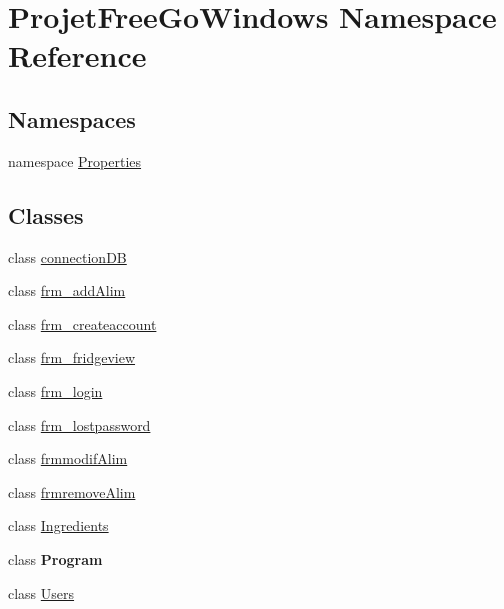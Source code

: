 \hypertarget{namespace_projet_free_go_windows}{}\section{Projet\+Free\+Go\+Windows Namespace Reference}
\label{namespace_projet_free_go_windows}
\subsection*{Namespaces}
\begin{DoxyCompactItemize}
\item 
namespace \hyperlink{namespace_projet_free_go_windows_1_1_properties}{Properties}
\end{DoxyCompactItemize}
\subsection*{Classes}
\begin{DoxyCompactItemize}
\item 
class \hyperlink{class_projet_free_go_windows_1_1connection_d_b}{connection\+DB}
\item 
class \hyperlink{class_projet_free_go_windows_1_1frm__add_alim}{frm\+\_\+add\+Alim}
\item 
class \hyperlink{class_projet_free_go_windows_1_1frm__createaccount}{frm\+\_\+createaccount}
\item 
class \hyperlink{class_projet_free_go_windows_1_1frm__fridgeview}{frm\+\_\+fridgeview}
\item 
class \hyperlink{class_projet_free_go_windows_1_1frm__login}{frm\+\_\+login}
\item 
class \hyperlink{class_projet_free_go_windows_1_1frm__lostpassword}{frm\+\_\+lostpassword}
\item 
class \hyperlink{class_projet_free_go_windows_1_1frmmodif_alim}{frmmodif\+Alim}
\item 
class \hyperlink{class_projet_free_go_windows_1_1frmremove_alim}{frmremove\+Alim}
\item 
class \hyperlink{class_projet_free_go_windows_1_1_ingredients}{Ingredients}
\item 
class {\bfseries Program}
\item 
class \hyperlink{class_projet_free_go_windows_1_1_users}{Users}
\end{DoxyCompactItemize}
